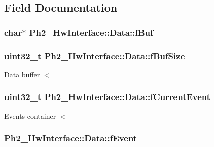 \subsection{Field Documentation}
\hypertarget{class_ph2___hw_interface_1_1_data_acf647e64b2febe8555e7b044e5cfc98d}{
\subsubsection[{f\-Buf}]{\setlength{\rightskip}{0pt plus 5cm}char$\ast$ Ph2\-\_\-\-Hw\-Interface\-::\-Data\-::f\-Buf\hspace{0.3cm}{\ttfamily [private]}}}\label{class_ph2___hw_interface_1_1_data_acf647e64b2febe8555e7b044e5cfc98d}
\hypertarget{class_ph2___hw_interface_1_1_data_aaf97e7ef5081a4a6a412c25382b3bafe}{
\subsubsection[{f\-Buf\-Size}]{\setlength{\rightskip}{0pt plus 5cm}uint32\-\_\-t Ph2\-\_\-\-Hw\-Interface\-::\-Data\-::f\-Buf\-Size\hspace{0.3cm}{\ttfamily [private]}}}\label{class_ph2___hw_interface_1_1_data_aaf97e7ef5081a4a6a412c25382b3bafe}
\hyperlink{class_ph2___hw_interface_1_1_data}{Data} buffer $<$ \hypertarget{class_ph2___hw_interface_1_1_data_a4566e332acab8fe25be41f05c2862222}{
\subsubsection[{f\-Current\-Event}]{\setlength{\rightskip}{0pt plus 5cm}uint32\-\_\-t Ph2\-\_\-\-Hw\-Interface\-::\-Data\-::f\-Current\-Event\hspace{0.3cm}{\ttfamily [private]}}}\label{class_ph2___hw_interface_1_1_data_a4566e332acab8fe25be41f05c2862222}
Events container $<$ \hypertarget{class_ph2___hw_interface_1_1_data_a1b13d9197eeb9fd673a42a35b55e8dd8}{
\subsubsection[{f\-Event}]{ Ph2\-\_\-\-Hw\-Interface\-::\-Data\-::f\-Event\hspace{0.3cm}{\ttfamily [private]}}}\label{class_ph2___hw_interface_1_1_data_a1b13d9197eeb9fd673a42a35b55e8dd8}
